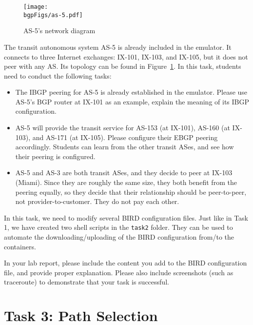 \begin{figure}[htb]
  \begin{center}
    \texttt{[image: \\bgpFigs/as-5.pdf]}
  \end{center}
  \caption{AS-5's network diagram}
  \label{bgp:fig:as5}
\end{figure}

The transit autonomous system AS-5 is already included in the emulator. 
It connects to three 
Internet exchanges: IX-101, IX-103, and IX-105,
but it does not peer with any AS. Its topology can be found 
in Figure~\ref{bgp:fig:as5}.
In this task, students need to conduct the following tasks:

\begin{itemize}
  \item The IBGP peering for AS-5 is already established in the 
    emulator. Please use AS-5's BGP router at IX-101 as an example,
    explain the meaning of its IBGP configuration.

  \item AS-5 will provide the transit service for AS-153 (at IX-101), 
    AS-160 (at IX-103), and AS-171 (at IX-105). 
    Please configure their EBGP peering accordingly. Students can 
    learn from the other transit ASes, and see how their peering
    is configured. 


  \item AS-5 and AS-3 are both transit ASes, and they decide to peer at IX-103 (Miami). 
    Since they are roughly the same size, they both benefit from the 
    peering equally, so they decide that
    their relationship should be peer-to-peer, not provider-to-customer.
    They do not pay each other. 
\end{itemize}

In this task, we need to modify several BIRD configuration files.
Just like in Task 1, we have created two shell scripts in the 
\texttt{task2} folder. They can be used to automate the 
downloading/uploading of the BIRD configuration from/to the 
containers.


In your lab report, please include the content you add to the 
BIRD configuration file, and provide proper explanation.
Please also include screenshots (such as traceroute) to demonstrate 
that your task is successful. 



\section{Task 3: Path Selection} 

